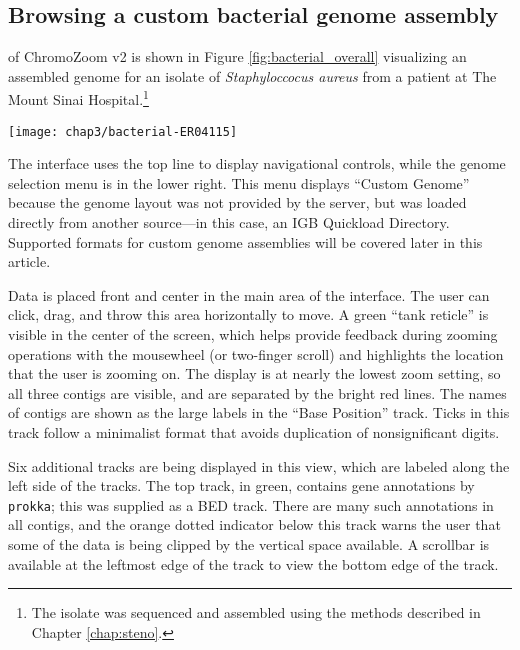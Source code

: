 \subsection{Browsing a custom bacterial genome assembly}

 of ChromoZoom v2 is shown in Figure \ref{fig:bacterial_overall} visualizing an assembled genome for an isolate of \emph{Staphyloccocus aureus} from a patient at The Mount Sinai Hospital.\footnote{The isolate was sequenced and assembled using the methods described in Chapter \ref{chap:steno}.}
\begin{figure*}[htb]
  \texttt{[image: chap3/bacterial-ER04115]}               
  \caption[Browsing a completed \emph{S. aureus} assembly with two plasmids]{\textbf{Browsing a completed \emph{S. aureus} assembly with two plasmids} (leftmost and rightmost small contigs). The top track, containing annotations of putative genes, has too much data to display in the available space (as is common for genomic data) which is indicated by the dotted orange line. This can be remedied by resizing the track (double arrow cursor) or scrolling (arrow cursor).}
  \label{fig:bacterial_overall}
\end{figure*}
The interface uses the top line to display navigational controls, while the genome selection menu is in the lower right. This menu displays ``Custom Genome'' because the genome layout was not provided by the server, but was loaded directly from another source—in this case, an IGB Quickload Directory. Supported formats for custom genome assemblies will be covered later in this article.

Data is placed front and center in the main area of the interface. The user can click, drag, and throw this area horizontally to move. A green ``tank reticle'' is visible in the center of the screen, which helps provide feedback during zooming operations with the mousewheel (or two-finger scroll) and highlights the location that the user is zooming on. The display is at nearly the lowest zoom setting, so all three contigs are visible, and are separated by the bright red lines. The names of contigs are shown as the large labels in the ``Base Position'' track. Ticks in this track follow a minimalist format that avoids duplication of nonsignificant digits.\autocite{Tufte2001,Krzywinski2013}

Six additional tracks are being displayed in this view, which are labeled along the left side of the tracks. The top track, in green, contains gene annotations by \texttt{prokka};\autocite{Seemann2014} this was supplied as a BED track. There are many such annotations in all contigs, and the orange dotted indicator below this track warns the user that some of the data is being clipped by the vertical space available. A scrollbar is available at the leftmost edge of the track to view the bottom edge of the track. 

